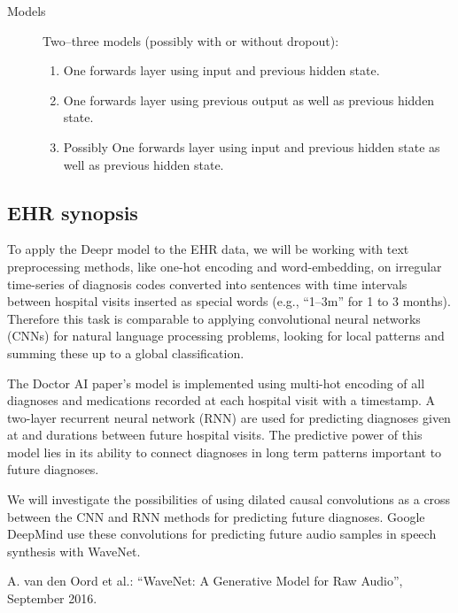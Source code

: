 \begin{description}
	\item[Models] Two--three models (possibly with or without dropout):
	
	\begin{enumerate}
		\item One forwards layer using input and previous hidden state.
		\item One forwards layer using previous output as well as previous hidden state.
		\item Possibly One forwards layer using input and previous hidden state as well as previous hidden state.
	\end{enumerate}
\end{description}

\subsection*{EHR synopsis}

To apply the Deepr model to the EHR data, we will be working with text preprocessing methods, like one-hot encoding and word-embedding, on irregular time-series of diagnosis codes converted into sentences with time intervals between hospital visits inserted as special words (e.g., “1--3m” for 1 to 3 months). Therefore this task is comparable to applying convolutional neural networks (CNNs) for natural language processing problems, looking for local patterns and summing these up to a global classification.

The Doctor AI paper’s model is implemented using multi-hot encoding of all diagnoses and medications recorded at each hospital visit with a timestamp. A two-layer recurrent neural network (RNN) are used for predicting diagnoses given at and durations between future hospital visits. The predictive power of this model lies in its ability to connect diagnoses in long term patterns important to future diagnoses.

We will investigate the possibilities of using dilated causal convolutions as a cross between the CNN and RNN methods for predicting future diagnoses. Google DeepMind use these convolutions for predicting future audio samples in speech synthesis with WaveNet.

A. van den Oord et al.: “WaveNet: A Generative Model for Raw Audio”, September 2016.
